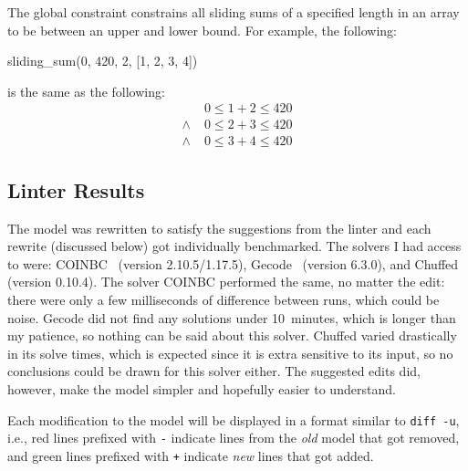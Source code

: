 \documentclass[a4paper,12pt]{article}
\begin{document}
The global constraint  constrains
all sliding sums of a specified length in an array to be between an upper and lower bound.
For example, the following:
\begin{mznnobreak}
sliding_sum(0, 420, 2, [1, 2, 3, 4])
\end{mznnobreak}
is the same as the following:
\begin{align*}
&0 \leq 1+2 \leq 420\\
\land\; &0 \leq 2+3 \leq 420\\ 
\land\; &0 \leq 3+4 \leq 420
\end{align*}

\subsection{Linter Results}\label{sec:nsp:results}
\begin{sloppypar}
The model was rewritten to satisfy the suggestions from the linter and each rewrite (discussed below) got
individually benchmarked.
The solvers I had access to were: COINBC~\cite{coinbc} (version
2.10.5/1.17.5), Gecode~\cite{gecode} (version 6.3.0), and Chuffed~\cite{Chuffed} (version 0.10.4).
The solver COINBC performed the same, no matter the edit: there were only a few milliseconds
of difference between runs, which could be noise. Gecode did not find
any solutions under 10~minutes, which is longer than my patience, so nothing can be said about this
solver. Chuffed varied drastically in its solve times, which is expected since it is
extra sensitive to its input, so no conclusions could be drawn for this solver either.
The suggested edits did, however, make the model simpler and hopefully easier to understand.
\end{sloppypar}

Each modification to the model will be displayed in a format similar to \texttt{diff -u},
i.e., red lines prefixed with \texttt{-} indicate lines from the \emph{old} model that
got removed, and green lines prefixed with \texttt{+} indicate \emph{new} lines that got added.
\end{document}
